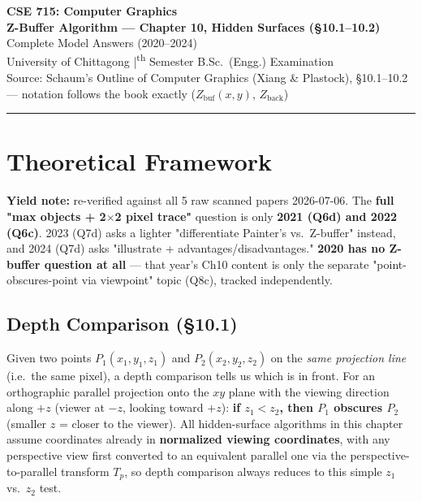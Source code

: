 \documentclass[12pt, a4paper]{article}
\newenvironment{answerbox}{\begin{mdframed}[style=answerframe]}{\end{mdframed}}
\newenvironment{notesbox}{\begin{mdframed}[style=notesframe]}{\end{mdframed}}
\begin{document}
\begin{center}
  {\LARGE\bfseries\color{sectionblue} CSE 715: Computer Graphics}\\[0.6em]
  {\Large\bfseries Z-Buffer Algorithm --- Chapter 10, Hidden Surfaces (\S10.1--10.2)}\\[0.3em]
  {\large Complete Model Answers (2020--2024)}\\[0.2em]
  {\normalsize University of Chittagong \quad|\textsuperscript{th} Semester B.Sc.\ (Engg.) Examination}\\[0.3em]
  {\small Source: Schaum's Outline of Computer Graphics (Xiang \& Plastock), \S10.1--10.2 --- notation follows the book exactly ($Z_{\mathrm{buf}}(x,y)$, $Z_{\mathrm{back}}$)}
\end{center}

\vspace{0.3em}\noindent\rule{\linewidth}{1pt}\vspace{0.5em}
\tableofcontents
\newpage

\section{Theoretical Framework}
\begin{notesbox}
\textbf{Yield note:} re-verified against all 5 raw scanned papers 2026-07-06. The \textbf{full "max objects + 2$\times$2 pixel trace"} question is only \textbf{2021 (Q6d) and 2022 (Q6c)}. 2023 (Q7d) asks a lighter "differentiate Painter's vs.\ Z-buffer" instead, and 2024 (Q7d) asks "illustrate + advantages/disadvantages." \textbf{2020 has no Z-buffer question at all} --- that year's Ch10 content is only the separate "point-obscures-point via viewpoint" topic (Q8c), tracked independently.
\end{notesbox}

\subsection{Depth Comparison (\S10.1)}
\begin{answerbox}
Given two points $P_1(x_1,y_1,z_1)$ and $P_2(x_2,y_2,z_2)$ on the \emph{same projection line} (i.e.\ the same pixel), a depth comparison tells us which is in front. For an orthographic parallel projection onto the $xy$ plane with the viewing direction along $+z$ (viewer at $-z$, looking toward $+z$): \textbf{if $z_1<z_2$, then $P_1$ obscures $P_2$} (smaller $z$ = closer to the viewer). All hidden-surface algorithms in this chapter assume coordinates already in \textbf{normalized viewing coordinates}, with any perspective view first converted to an equivalent parallel one via the perspective-to-parallel transform $T_p$, so depth comparison always reduces to this simple $z_1$ vs.\ $z_2$ test.
\end{answerbox}
\end{document}
